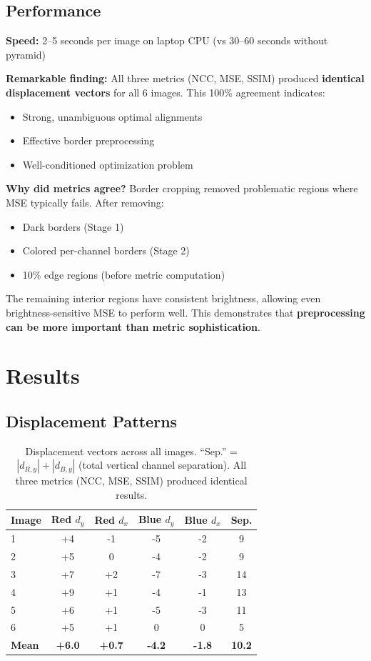 {\subsection{Performance}

\textbf{Speed:} 2--5 seconds per image on laptop CPU (vs 30--60 seconds without pyramid)

\textbf{Remarkable finding:} All three metrics (NCC, MSE, SSIM) produced \textbf{identical displacement vectors} for all 6 images. This 100\% agreement indicates:
\begin{itemize}
\item Strong, unambiguous optimal alignments
\item Effective border preprocessing
\item Well-conditioned optimization problem
\end{itemize}

\textbf{Why did metrics agree?} Border cropping removed problematic regions where MSE typically fails. After removing:
\begin{itemize}
\item Dark borders (Stage 1)
\item Colored per-channel borders (Stage 2)
\item 10\% edge regions (before metric computation)
\end{itemize}

The remaining interior regions have consistent brightness, allowing even brightness-sensitive MSE to perform well. This demonstrates that \textbf{preprocessing can be more important than metric sophistication}.

\section{Results}

\subsection{Displacement Patterns}

\begin{table}[h]
\centering
\begin{tabular}{lccccc}
\hline
\textbf{Image} & \textbf{Red $d_y$} & \textbf{Red $d_x$} & \textbf{Blue $d_y$} & \textbf{Blue $d_x$} & \textbf{Sep.} \\
\hline
1 & +4 & -1 & -5 & -2 & 9 \\
2 & +5 & 0 & -4 & -2 & 9 \\
3 & +7 & +2 & -7 & -3 & 14 \\
4 & +9 & +1 & -4 & -1 & 13 \\
5 & +6 & +1 & -5 & -3 & 11 \\
6 & +5 & +1 & 0 & 0 & 5 \\
\hline
\textbf{Mean} & \textbf{+6.0} & \textbf{+0.7} & \textbf{-4.2} & \textbf{-1.8} & \textbf{10.2} \\
\hline
\end{tabular}
\caption{Displacement vectors across all images. ``Sep.'' = $|d_{R,y}| + |d_{B,y}|$ (total vertical channel separation). All three metrics (NCC, MSE, SSIM) produced identical results.}
\label{tab:displacements}
\end{table}

}
